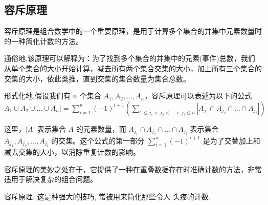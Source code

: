 
\subsection{容斥原理}

容斥原理是组合数学中的一个重要原理，是用于计算多个集合的并集中元素数量时的一种简化计数的方法。

通俗地,该原理可以解释为：为了找到多个集合的并集中的元素(事件)总数，我们从单个集合的大小开始计算，减去所有两个集合交集的大小，加上所有三个集合的交集的大小，依此类推，直到交集的集合数量为集合总数。

形式化地,假设我们有 \(n\) 个集合 \(A_1, A_2, \ldots, A_n\)，容斥原理可以表述为以下的公式
$
A_1 \cup A_2 \cup \ldots \cup A_n| = \sum_{i=1}^{n} (-1)^{i+1} \left( \sum_{1 \leq j_1 < j_2 < \ldots < j_i \leq n} |A_{j_1} \cap A_{j_2} \cap \ldots \cap A_{j_i}| \right)
$

这里，\( |A| \) 表示集合 \(A\) 的元素数量，而 \(A_{j_1} \cap A_{j_2} \cap \ldots \cap A_{j_i}\) 表示集合 \(A_{j_1}, A_{j_2}, \ldots, A_{j_i}\) 的交集。这个公式的第一部分 \(\sum_{i=1}^{n} (-1)^{i+1}\) 是为了交替加上和减去交集的大小，以消除重复计数的影响。

容斥原理的美妙之处在于，它提供了一种在重叠数据存在时准确计数的方法，非常适用于解决复杂的组合问题。





容斥原理. 这是种强大的技巧, 常被用来简化那些令人
头疼的计数.